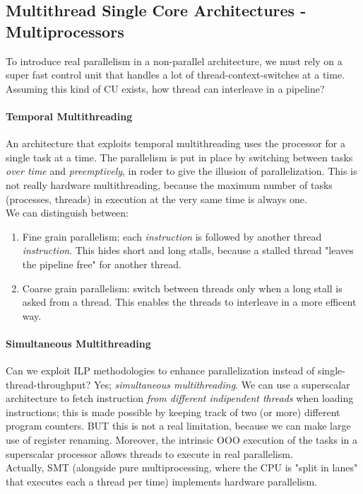 \documentclass[10pt,a4paper]{article}
\begin{document}
			\subsection{Multithread Single Core Architectures - Multiprocessors}
				To introduce real parallelism in a non-parallel architecture, we must rely on a super fast control unit that handles a lot of thread-context-switches at a time. Assuming this kind of CU exists, how thread can interleave in a pipeline? 
				
				\paragraph{Temporal Multithreading}
					An architecture that exploits temporal multithreading uses the processor for a single task at a time. The parallelism is put in place by switching between tasks \emph{over time} and \emph{preemptively}, in roder to give the illusion of parallelization. This is not really hardware multithreading, because the maximum number of tasks (processes, threads) in execution at the very same time is always one.\\
					We can distinguish between:
					\begin{enumerate}
						\item Fine grain parallelism: each \emph{instruction} is followed by another thread \emph{instruction}. This hides short and long stalls, because a stalled thread "leaves the pipeline free" for another thread. 
						\item Coarse grain parallelism: switch between threads only when a long stall is asked from a thread. This enables the threads to interleave in a more efficent way. 
					\end{enumerate}
				
				\paragraph{Simultaneous Multithreading}
					Can we exploit ILP methodologies to enhance parallelization instead of single-thread-throughput? Yes; \emph{simultaneous multithreading}. We can use a superscalar architecture to fetch instruction \emph{from different indipendent threads} when loading instructions; this is made possible by keeping track of two (or more) different program counters. BUT this is not a real limitation, because we can make large use of register renaming. Moreover, the intrinsic OOO execution of the tasks in a superscalar processor allows threads to execute in real parallelism.\\
					Actually, SMT (alongside pure multiprocessing, where the CPU is "split in lanes" that executes each a thread per time) implements hardware parallelism.
					
\end{document}

